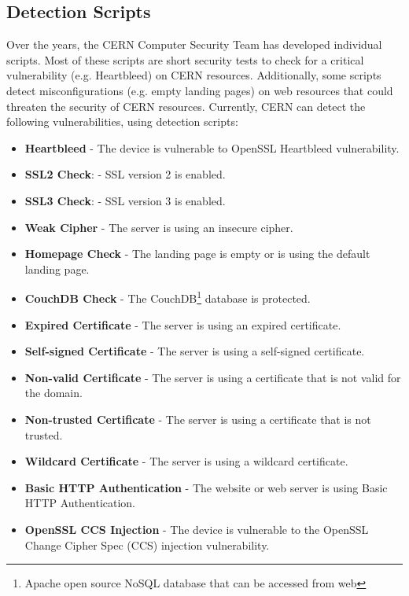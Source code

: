 \subsection{Detection Scripts}
Over the years, the CERN Computer Security Team has developed individual scripts. Most of these scripts are short security tests to check for a critical vulnerability (e.g. Heartbleed) on CERN resources. Additionally, some scripts detect misconfigurations (e.g. empty landing pages) on web resources that could threaten the security of CERN resources. Currently, CERN can detect the following vulnerabilities, using detection scripts:
\begin{itemize}
\item \textbf{Heartbleed} - The device is vulnerable to OpenSSL Heartbleed vulnerability.
\item \textbf{SSL2 Check}: - SSL version 2 is enabled.
\item \textbf{SSL3 Check}: - SSL version 3 is enabled.
\item \textbf{Weak Cipher} - The server is using an insecure cipher.
\item \textbf{Homepage Check} - The landing page is empty or is using the default landing page.
\item \textbf{CouchDB Check} - The CouchDB\footnote{Apache open source NoSQL database that can be accessed from web} database is protected.
\item \textbf{Expired Certificate} - The server is using an expired certificate.
\item \textbf{Self-signed Certificate} - The server is using a self-signed certificate.
\item \textbf{Non-valid Certificate} - The server is using a certificate that is not valid for the domain.
\item \textbf{Non-trusted Certificate} - The server is using a certificate that is not trusted.
\item \textbf{Wildcard Certificate} - The server is using a wildcard certificate.
\item \textbf{Basic HTTP Authentication} - The website or web server is using Basic HTTP Authentication.
\item \textbf{OpenSSL CCS Injection} - The device is vulnerable to the OpenSSL Change Cipher Spec (CCS) injection vulnerability.

\end{itemize}



